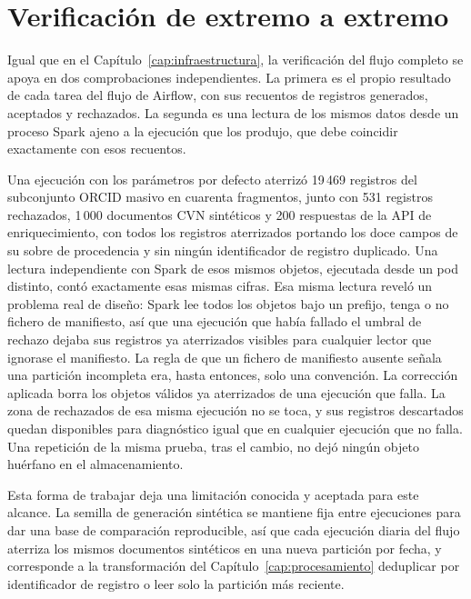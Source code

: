 \section{Verificación de extremo a extremo}
\label{sec:ingesta_verificacion}

Igual que en el Capítulo~\ref{cap:infraestructura}, la verificación del
flujo completo se apoya en dos comprobaciones independientes. La primera
es el propio resultado de cada tarea del flujo de Airflow, con sus
recuentos de registros generados, aceptados y rechazados. La segunda es
una lectura de los mismos datos desde un proceso Spark ajeno a la
ejecución que los produjo, que debe coincidir exactamente con esos
recuentos.

Una ejecución con los parámetros por defecto aterrizó 19\,469 registros
del subconjunto ORCID masivo en cuarenta fragmentos, junto con 531
registros rechazados, 1\,000 documentos CVN sintéticos y 200 respuestas de
la API de enriquecimiento, con todos los registros aterrizados portando
los doce campos de su sobre de procedencia y sin ningún identificador de
registro duplicado. Una lectura independiente con Spark de esos mismos
objetos, ejecutada desde un pod distinto, contó exactamente esas mismas
cifras. Esa misma lectura reveló un problema real de diseño: Spark lee
todos los objetos bajo un prefijo, tenga o no fichero de manifiesto, así
que una ejecución que había fallado el umbral de rechazo dejaba sus
registros ya aterrizados visibles para cualquier lector que ignorase el
manifiesto. La regla de que un fichero de manifiesto ausente señala una
partición incompleta era, hasta entonces, solo una convención. La corrección
aplicada borra los objetos válidos ya aterrizados de una ejecución que
falla. La zona de rechazados de esa misma ejecución no se toca, y sus
registros descartados quedan disponibles para diagnóstico igual que en
cualquier ejecución que no falla. Una repetición de la misma prueba, tras
el cambio, no dejó ningún objeto huérfano en el almacenamiento.

Esta forma de trabajar deja una limitación conocida y aceptada para este
alcance. La semilla de generación sintética se mantiene fija entre
ejecuciones para dar una base de comparación reproducible, así que cada
ejecución diaria del flujo aterriza los mismos documentos sintéticos en
una nueva partición por fecha, y corresponde a la transformación del
Capítulo~\ref{cap:procesamiento} deduplicar por identificador de registro
o leer solo la partición más reciente.
